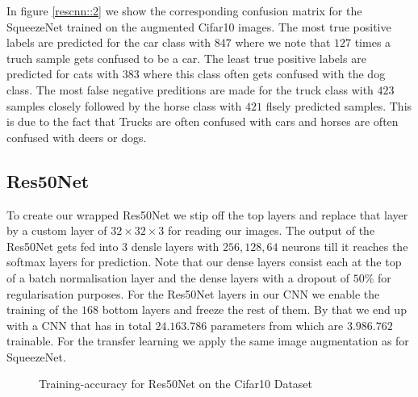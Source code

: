 \documentclass[11pt]{article}
\begin{document}
In figure \ref{rescnn::2} we show the corresponding confusion matrix for the SqueezeNet trained on the augmented Cifar10 images. The most true positive labels are predicted for the car class with $847$ where we note that $127$ times a truch sample gets confused to be a car. The least true positive labels are predicted for cats with $383$ where this class often gets confused with the dog class. The most false negative preditions are made for the truck class with $423$ samples closely followed by the horse class with $421$ flsely predicted samples. This is due to the fact that Trucks are often confused with cars and horses are often confused with deers or dogs.

\subsection{Res50Net}
To create our wrapped Res50Net we stip off the top layers and replace that layer by a custom layer of $32\times 32 \times 3$ for reading our images. The output of the Res50Net gets fed into $3$ densle layers with $256, 128, 64$ neurons till it reaches the softmax layers for prediction. Note that our dense layers consist each at the top of a batch normalisation layer and the dense layers with a dropout of $50\%$ for regularisation purposes. For the Res50Net layers in our CNN we enable the training of the $168$ bottom layers and freeze the rest of them. By that we end up with a CNN that has in total $24.163.786$ parameters from which are $3.986.762$ trainable. For the transfer learning we apply the same image augmentation as for SqueezeNet.

\begin{figure}
\centering
{}
  \hfill
  \hfill
\caption{Training-accuracy for Res50Net on the Cifar10 Dataset}
\label{rescnn::3}
\end{figure}
\end{document}
